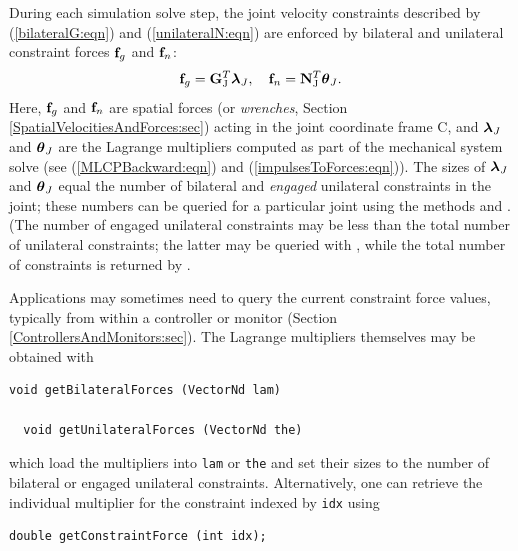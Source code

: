 During each simulation solve step, the joint velocity constraints
described by (\ref{bilateralG:eqn}) and (\ref{unilateralN:eqn}) are
enforced by bilateral and unilateral constraint forces ${\bf f}_g$ and
${\bf f}_n$:
%
\begin{equation}
{\bf f}_g = {\bf G}_\text{J}^T \boldsymbol\lambda_J, \quad {\bf f}_n = {\bf N}_\text{J}^T \boldsymbol\theta_J.
\end{equation}
%
Here, ${\bf f}_g$ and ${\bf f}_n$ are spatial forces (or {\it wrenches}, Section
\ref{SpatialVelocitiesAndForces:sec}) acting in the joint coordinate
frame C, and $\boldsymbol\lambda_J$ and $\boldsymbol\theta_J$ are the Lagrange multipliers
computed as part of the mechanical system solve (see
(\ref{MLCPBackward:eqn}) and (\ref{impulsesToForces:eqn})).  The sizes
of $\boldsymbol\lambda_J$ and $\boldsymbol\theta_J$ equal the number of bilateral and {\it
engaged} unilateral constraints in the joint; these numbers can be
queried for a particular joint using the methods
and
.
(The number of engaged unilateral constraints may be less than the
total number of unilateral constraints; the latter may be queried with
,
while the total number of
constraints is returned by
.

Applications may sometimes need to query the current constraint force
values, typically from within a controller
or monitor (Section \ref{ControllersAndMonitors:sec}).
The Lagrange multipliers themselves may be obtained with
\begin{lstlisting}[]
  void getBilateralForces (VectorNd lam)

  void getUnilateralForces (VectorNd the)
\end{lstlisting}
%
which load the multipliers into {\tt lam} or {\tt the} and set their
sizes to the number of bilateral or engaged unilateral
constraints. Alternatively, one can retrieve the individual multiplier
for the constraint indexed by {\tt idx} using
\begin{lstlisting}[]
  double getConstraintForce (int idx);
\end{lstlisting}
%

